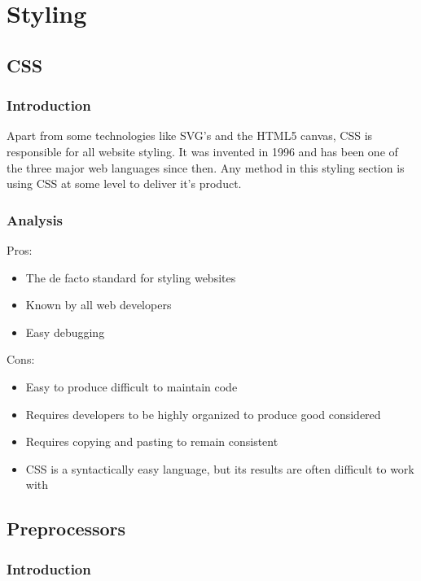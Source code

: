 \documentclass[draftclsnofoot,onecolumn,letterpaper,10pt,compsoc]{IEEEtran}
\begin{document}
\section{Styling}

  \subsection{CSS}
    \subsubsection{Introduction}

    Apart from some technologies like SVG's and the HTML5 canvas, CSS is responsible for all website styling.
    It was invented in 1996 and has been one of the three major web languages since then.
    Any method in this styling section is using CSS at some level to deliver it's product.

    \subsubsection{Analysis}
    Pros:
    \begin{itemize}
      \item The de facto standard for styling websites
      \item Known by all web developers
      \item Easy debugging
    \end{itemize}

    Cons:
    \begin{itemize}
      \item Easy to produce difficult to maintain code
      \item Requires developers to be highly organized to produce good considered
      \item Requires copying and pasting to remain consistent
      \item CSS is a syntactically easy language, but its results are often difficult to work with
    \end{itemize}

  \subsection{Preprocessors}
    \subsubsection{Introduction}
\end{document}
